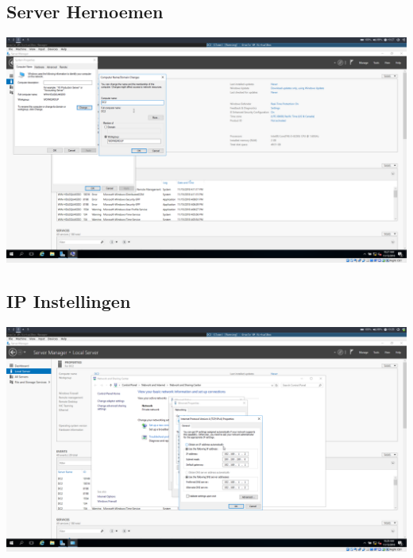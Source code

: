 \documentclass[a4paper]{article}
\begin{document}
\subsection{Server Hernoemen}
\begin{center}
	\includegraphics[width=15cm]{Pictures/DC2/Basisconfiguratie/1542306425.png}
\end{center}
\subsection{IP Instellingen}
\begin{center}
	\includegraphics[width=15cm]{Pictures/DC2/Basisconfiguratie/1542306587.png}
\end{center}
\end{document}
